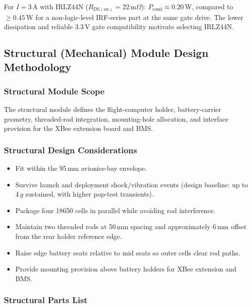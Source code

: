 For $I = 3$\,A with IRLZ44N ($R_\mathrm{DS(on)} = 22$\,m$\Omega$):
$P_\mathrm{cond} \approx 0.20$\,W, compared to $\geq 0.45$\,W for a
non-logic-level IRF-series part at the same gate drive. The lower dissipation
and reliable 3.3\,V gate compatibility motivate selecting IRLZ44N.

\subsection{Structural (Mechanical) Module Design Methodology}

\subsubsection{Structural Module Scope}

The structural module defines the flight-computer holder, battery-carrier
geometry, threaded-rod integration, mounting-hole allocation, and interface
provision for the XBee extension board and BMS.

\subsubsection{Structural Design Considerations}

\begin{itemize}
  \item Fit within the 95\,mm avionics-bay envelope.
  \item Survive launch and deployment shock/vibration events (design baseline:
    up to 4\,$g$ sustained, with higher pop-test transients).
  \item Package four 18650 cells in parallel while avoiding rod interference.
  \item Maintain two threaded rods at 50\,mm spacing and approximately 6\,mm
    offset from the rear holder reference edge.
  \item Raise edge battery seats relative to mid seats so outer cells clear rod
    paths.
  \item Provide mounting provision above battery holders for XBee extension and
    BMS.
\end{itemize}

\subsubsection{Structural Parts List}

